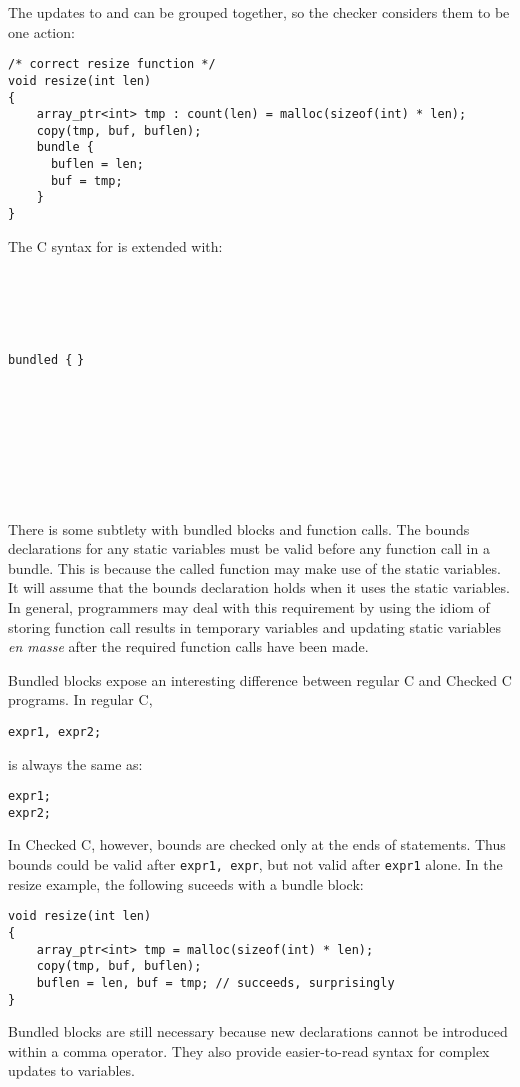 The updates to  and  can be grouped together,
so the checker considers them to be one action:
\begin{lstlisting}
/* correct resize function */
void resize(int len) 
{
    array_ptr<int> tmp : count(len) = malloc(sizeof(int) * len);
    copy(tmp, buf, buflen);
    bundle {
      buflen = len;
      buf = tmp;
    }
}
\end{lstlisting}

The C syntax for is extended with:
\begin{tabbing}
\=\\
\>\code{;} \\
\\
 \\
\>\lstinline|bundled {|  \lstinline|}| \\
\\
\\
\>  \\
\>  \\
\\
\\
\> \\
\>  
\end{tabbing}

There is some subtlety with bundled blocks and function calls. The
bounds declarations for any static variables must be valid before any
function call in a bundle. This is because the called function may make
use of the static variables. It will assume that the bounds declaration
holds when it uses the static variables. In general, programmers may
deal with this requirement by using the idiom of storing function call
results in temporary variables and updating static variables \textit{en
masse} after the required function calls have been made.

Bundled blocks expose an interesting difference between regular C
and Checked C programs.  In regular C, 
\begin{lstlisting}
expr1, expr2;
\end{lstlisting}

is always the same as:

\begin{lstlisting}
expr1;
expr2;
\end{lstlisting}

In Checked C, however, bounds are checked only at the ends of
statements.  Thus bounds could be valid after
\lstinline+expr1, expr+, but not valid after \lstinline+expr1+ alone.
In the resize example, the following suceeds with a bundle
block:
\begin{lstlisting}
void resize(int len) 
{
    array_ptr<int> tmp = malloc(sizeof(int) * len);
    copy(tmp, buf, buflen);
    buflen = len, buf = tmp; // succeeds, surprisingly
}
\end{lstlisting}
Bundled blocks are still necessary because new declarations
cannot be introduced within a comma operator.  They also provide
easier-to-read syntax for complex updates to variables.

